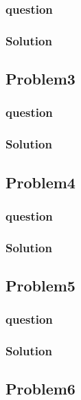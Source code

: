 \documentclass[journal,12pt,twocolumn]{IEEEtran}
\begin{document}
\subsubsection{question}

\subsubsection{Solution}


\subsection{Problem3}
\subsubsection{question}

\subsubsection{Solution}


\subsection{Problem4}
\subsubsection{question}

\subsubsection{Solution}


\subsection{Problem5}
\subsubsection{question}

\subsubsection{Solution}


\subsection{Problem6}
\end{document}

